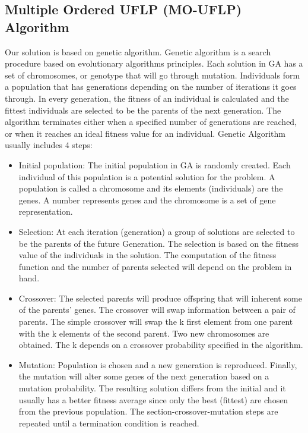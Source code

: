 \documentclass{article}
\begin{document}
\subsection{Multiple Ordered UFLP (MO-UFLP) Algorithm}
Our solution is based on genetic algorithm. Genetic algorithm is a search procedure based on evolutionary algorithms principles. Each solution in GA has a set of chromosomes, or genotype that will go through mutation. Individuals form a population that has generations depending on the number of iterations it goes through. In every generation, the fitness of an individual is calculated and the fittest individuals are selected to be the parents of the next generation. The algorithm terminates either when a specified number of generations are reached, or when it reaches an ideal fitness value for an individual.
Genetic Algorithm usually includes 4 steps:
\begin{itemize}
	\item  Initial population: The initial population in GA is randomly created. Each individual of this population is a potential solution for the problem. A population is called a chromosome and its elements (individuals) are the genes. A number represents genes and the chromosome is a set of gene representation.
	\item  Selection: At each iteration (generation) a group of solutions are selected to be the parents of the future Generation. The selection is based on the fitness value of the individuals in the solution. The computation of the fitness function and the number of parents selected will depend on the problem in hand.
	\item  Crossover: The selected parents will produce offspring that will inherent some of the parents’ genes. The crossover will swap information between a pair of parents. The simple crossover will swap the k first element from one parent with the k elements of the second parent. Two new chromosomes are obtained. The k depends on a crossover probability specified in the algorithm.
	\item Mutation:	Population is chosen and a new generation is reproduced.
	Finally, the mutation will alter some genes of the next generation based on a mutation probability. The resulting solution differs from the initial and it usually has a better fitness average since only the best (fittest) are chosen from the previous population. The section-crossover-mutation steps are repeated until a termination condition is reached.
\end{itemize}
\end{document}
